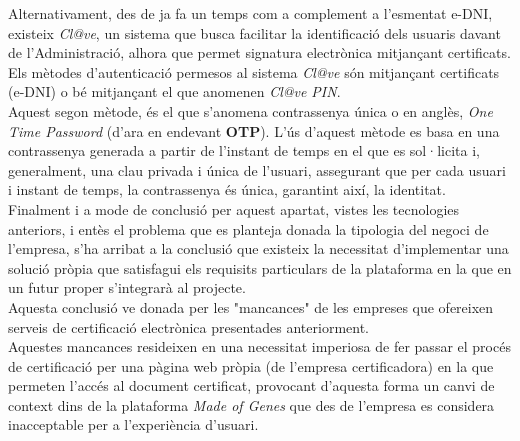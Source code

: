 \newline Alternativament, des de ja fa un temps com a complement a l'esmentat e-DNI, existeix \textit{Cl@ve}, un sistema que busca facilitar la identificació dels usuaris davant de l'Administració, alhora que permet signatura electrònica mitjançant certificats.\\
\newline Els mètodes d'autenticació permesos al sistema \textit{Cl@ve} són mitjançant certificats (e-DNI) o bé mitjançant el que anomenen \textit{Cl@ve PIN}.\\
\newline Aquest segon mètode, és el que s'anomena contrassenya única o en anglès, \textit{One Time Password} (d'ara en endevant \textbf{OTP}). L'ús d'aquest mètode es basa en una contrassenya generada a partir de l'instant de temps en el que es sol·licita i, generalment, una clau privada i única de l'usuari, assegurant que per cada usuari i instant de temps, la contrassenya és única, garantint així, la identitat.\\
\newline Finalment i a mode de conclusió per aquest apartat, vistes les tecnologies anteriors, i entès el problema que es planteja donada la tipologia del negoci de l'empresa, s'ha arribat a la conclusió que existeix la necessitat d'implementar una solució pròpia que satisfagui els requisits particulars de la plataforma en la que en un futur proper s'integrarà al projecte.\\
\newline Aquesta conclusió ve donada per les "mancances" de les empreses que ofereixen serveis de certificació electrònica presentades anteriorment.\\
Aquestes mancances resideixen en una necessitat imperiosa de fer passar el procés de certificació per una pàgina web pròpia (de l'empresa certificadora) en la que permeten l'accés al document certificat, provocant d'aquesta forma un canvi de context dins de la plataforma \textit{Made of Genes} que des de l'empresa es considera inacceptable per a l'experiència d'usuari.